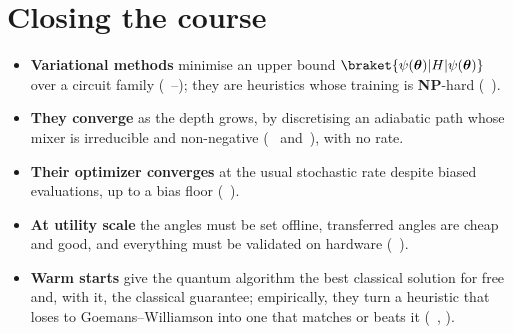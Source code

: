 \documentclass[handoutsbeamer.tex]{subfiles}
\begin{document}
\section{Closing the course}

\begin{frame}
\onp{\footnotesize}
\begin{itemize}\setlength\itemsep{0.4em}
    \item \textbf{Variational methods} minimise an upper bound $\braket{\psi(\boldsymbol\theta)|H|\psi(\boldsymbol\theta)}$ over a circuit family (\Chaps~--); they are heuristics whose training is \textbf{NP}-hard (\Chap~).
    \item \textbf{They converge} as the depth grows, by discretising an adiabatic path whose mixer is irreducible and non-negative (\Chaps~ and~), with no rate.
    \item \textbf{Their optimizer converges} at the usual stochastic rate despite biased evaluations, up to a bias floor (\Chap~).
    \item \textbf{At utility scale} the angles must be set offline, transferred angles are cheap and good, and everything must be validated on hardware (\Chap~).
    \item \textbf{Warm starts} give the quantum algorithm the best classical solution for free and, with it, the classical guarantee; empirically, they turn a heuristic that loses to Goemans--Williamson into one that matches or beats it (\Chaps~, ).
\end{itemize}
\end{frame}


\begin{frame}[allowframebreaks]
\biblio
\end{frame}
\end{document}
